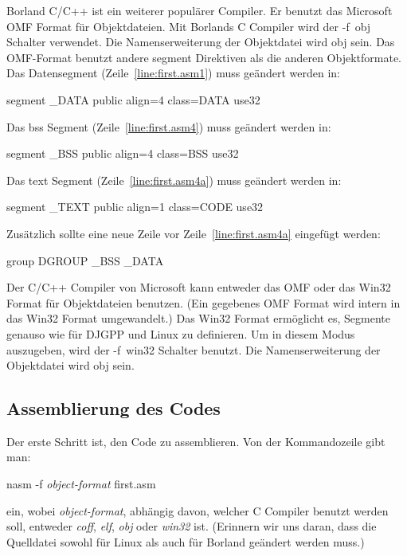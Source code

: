 {Borland C/C++  ist ein weiterer popul\"{a}rer
Compiler. Er benutzt das Microsoft OMF Format f\"{u}r Objektdateien. Mit
Borlands C Compiler wird der {\code -f~obj} Schalter verwendet. Die
Namenserweiterung der Objektdatei wird {\code obj} sein. Das
OMF-Format benutzt andere {\code segment} Direktiven als die anderen
Objektformate. Das Datensegment (Zeile~\ref{line:first.asm1}) muss
ge\"{a}ndert werden in:
\begin{CodeQuote}
 segment \_DATA public align=4 class=DATA use32
\end{CodeQuote}
Das bss Segment (Zeile~\ref{line:first.asm4}) muss ge\"{a}ndert werden
in:
\begin{CodeQuote}
 segment \_BSS public align=4 class=BSS use32
\end{CodeQuote}
Das text Segment (Zeile~\ref{line:first.asm4a}) muss ge\"{a}ndert werden
in:
\begin{CodeQuote}
 segment \_TEXT public align=1 class=CODE use32
\end{CodeQuote}
Zus\"{a}tzlich sollte eine neue Zeile vor Zeile~\ref{line:first.asm4a}
eingef\"{u}gt werden:
\begin{CodeQuote}
 group DGROUP \_BSS \_DATA
\end{CodeQuote}

Der C/C++ Compiler von Microsoft  kann
entweder das OMF oder das Win32 Format f\"{u}r Objektdateien benutzen.
(Ein gegebenes OMF Format wird intern in das Win32 Format
umgewandelt.) Das Win32 Format erm\"{o}glicht es, Segmente genauso wie
f\"{u}r DJGPP und Linux zu definieren. Um in diesem Modus auszugeben,
wird der {\code -f~win32} Schalter benutzt. Die Namenserweiterung
der Objektdatei wird {\code obj} sein.

\subsection{Assemblierung des Codes}

Der erste Schritt ist, den Code zu assemblieren. Von der
Kommandozeile gibt man:
\begin{CodeQuote}
 nasm -f {\em object-format} first.asm
\end{CodeQuote}
ein, wobei {\em object-format}, abh\"{a}ngig davon, welcher C Compiler
benutzt werden soll, entweder {\em coff\/}, {\em elf\/}, {\em obj}
oder {\em win32} ist. (Erinnern wir uns daran, dass die Quelldatei
sowohl f\"{u}r Linux als auch f\"{u}r Borland ge\"{a}ndert werden muss.)

}
